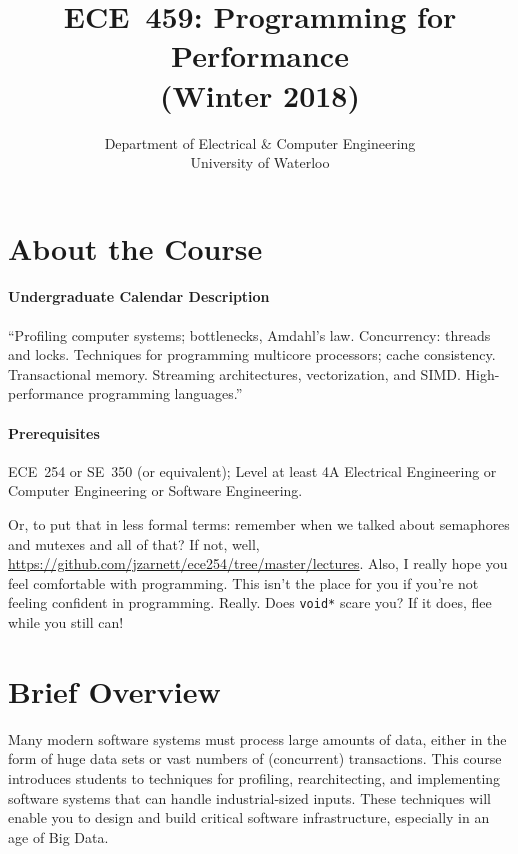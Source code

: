 \documentclass[letterpaper,10pt]{article}
\date{}
\let\LaTeXtitle\title
\renewcommand{\title}[1]{\LaTeXtitle{\textsf{#1}}}
\begin{document}
\title{\bf\LARGE ECE~459: Programming for Performance\\ (Winter 2018)}
\author{Department of Electrical \& Computer Engineering \\
                University of Waterloo}
\renewcommand{\today}{}
\maketitle
\vspace*{-2em}

\section*{About the Course}

\paragraph{Undergraduate Calendar Description} ``Profiling computer systems; bottlenecks, Amdahl's law. Concurrency: threads and locks. Techniques for programming multicore processors; cache consistency. Transactional memory. Streaming architectures, vectorization, and SIMD. High-performance programming languages.''

\paragraph{Prerequisites} ECE~254 or SE~350 (or equivalent); Level at least 4A Electrical Engineering or Computer Engineering or Software Engineering.

Or, to put that in less formal terms: remember when we talked about semaphores and mutexes and all of that? If not, well, \url{https://github.com/jzarnett/ece254/tree/master/lectures}. Also, I really hope you feel comfortable with programming. This isn't the place for you if you're not feeling confident in programming. Really. Does \texttt{void*} scare you? If it does, flee while you still can!

\section*{Brief Overview}

Many modern software systems must process large amounts of data, either in the
form of huge data sets or vast numbers of (concurrent) transactions.  This
course introduces students to techniques for profiling, rearchitecting, and
implementing software systems that can handle industrial-sized
inputs. These techniques will enable you to design and build
critical software infrastructure, especially in an age of Big Data.
\end{document}

